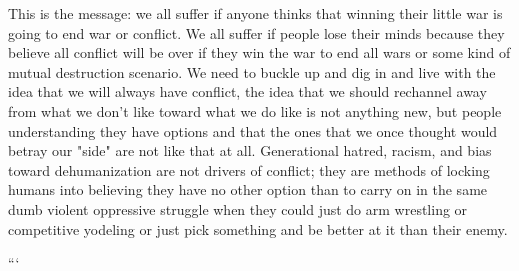 This is the message: we all suffer if anyone thinks that winning their little war is going to end war or conflict. We all suffer if people lose their minds because they believe all conflict will be over if they win the war to end all wars or some kind of mutual destruction scenario. We need to buckle up and dig in and live with the idea that we will always have conflict, the idea that we should rechannel away from what we don't like toward what we do like is not anything new, but people understanding they have options and that the ones that we once thought would betray our "side" are not like that at all. Generational hatred, racism, and bias toward dehumanization are not drivers of conflict; they are methods of locking humans into believing they have no other option than to carry on in the same dumb violent oppressive struggle when they could just do arm wrestling or competitive yodeling or just pick something and be better at it than their enemy.

```

